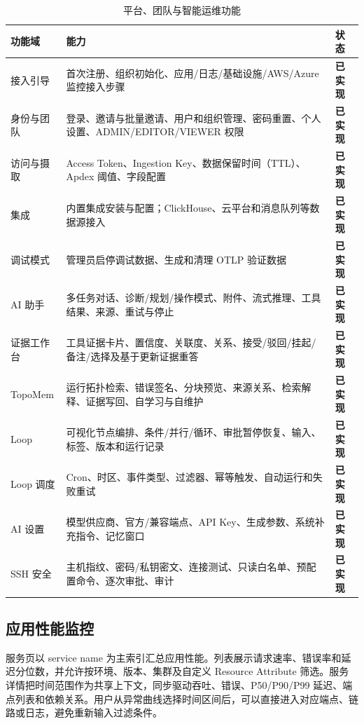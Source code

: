 \documentclass[conference,10pt]{IEEEtran}
\newcommand{\implemented}{\textcolor{scrygreen}{\textbf{已实现}}}
\begin{document}
\begin{table}[t]
\caption{平台、团队与智能运维功能}
\label{tab:functions-platform}
\centering
\small
\begin{tabularx}{\textwidth}{p{1.9cm}Y p{2.3cm}}
\toprule
\textbf{功能域} & \textbf{能力} & \textbf{状态} \\
\midrule
接入引导 & 首次注册、组织初始化、应用/日志/基础设施/AWS/Azure 监控接入步骤 & \implemented \\
身份与团队 & 登录、邀请与批量邀请、用户和组织管理、密码重置、个人设置、ADMIN/EDITOR/VIEWER 权限 & \implemented \\
访问与摄取 & Access Token、Ingestion Key、数据保留时间（TTL）、Apdex 阈值、字段配置 & \implemented \\
集成 & 内置集成安装与配置；ClickHouse、云平台和消息队列等数据源接入 & \implemented \\
调试模式 & 管理员启停调试数据、生成和清理 OTLP 验证数据 & \implemented \\
AI 助手 & 多任务对话、诊断/规划/操作模式、附件、流式推理、工具结果、来源、重试与停止 & \implemented \\
证据工作台 & 工具证据卡片、置信度、关联度、关系、接受/驳回/挂起/备注/选择及基于更新证据重答 & \implemented \\
TopoMem & 运行拓扑检索、错误签名、分块预览、来源关系、检索解释、证据写回、自学习与自维护 & \implemented \\
Loop & 可视化节点编排、条件/并行/循环、审批暂停恢复、输入、标签、版本和运行记录 & \implemented \\
Loop 调度 & Cron、时区、事件类型、过滤器、幂等触发、自动运行和失败重试 & \implemented \\
AI 设置 & 模型供应商、官方/兼容端点、API Key、生成参数、系统补充指令、记忆窗口 & \implemented \\
SSH 安全 & 主机指纹、密码/私钥密文、连接测试、只读白名单、预配置命令、逐次审批、审计 & \implemented \\
\bottomrule
\end{tabularx}
\end{table}

\subsection{应用性能监控}

服务页以 service name 为主索引汇总应用性能。列表展示请求速率、错误率和延迟分位数，并允许按环境、版本、集群及自定义 Resource Attribute 筛选。服务详情把时间范围作为共享上下文，同步驱动吞吐、错误、P50/P90/P99 延迟、端点列表和依赖关系。用户从异常曲线选择时间区间后，可以直接进入对应端点、链路或日志，避免重新输入过滤条件。
\end{document}

